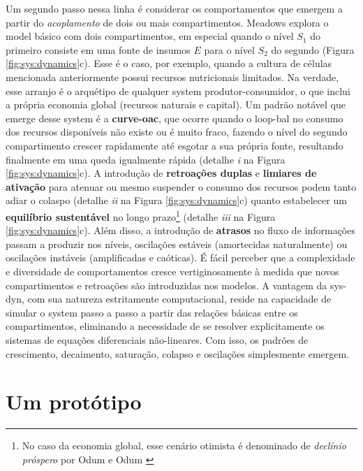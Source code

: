 \documentclass[./main.tex]{subfiles}
\begin{document}
\par Um segundo passo nessa linha é considerar os comportamentos que emergem a partir do \textit{acoplamento} de dois ou mais compartimentos. Meadows explora o \gls{model} básico com dois compartimentos, em especial quando o nível $S_1$ do primeiro consiste em uma fonte de insumos $E$ para o nível $S_2$ do segundo (Figura \ref{fig:sys:dynamics}c). Esse é o caso, por exemplo, quando a cultura de células mencionada anteriormente possui recursos nutricionais limitados. Na verdade, esse arranjo é o arquétipo de qualquer \gls{system} produtor-consumidor, o que inclui a própria economia global (recursos naturais e capital). Um padrão notável que emerge desse \gls{system} é a \textbf{\gls{curve-oac}}, que ocorre quando o \gls{loop-bal} no consumo dos recursos disponíveis não existe ou é muito fraco, fazendo o nível do segundo compartimento crescer rapidamente até esgotar a sua própria fonte, resultando finalmente em uma queda igualmente rápida (detalhe \textrm{\textit{i}} na Figura \ref{fig:sys:dynamics}c). A introdução de \textbf{retroações duplas} e \textbf{limiares de ativação} para atenuar ou mesmo suspender o consumo dos recursos podem tanto adiar o colaspo (detalhe \textrm{\textit{ii}} na Figura \ref{fig:sys:dynamics}c) quanto estabelecer um \textbf{equilíbrio sustentável} no longo prazo\footnote{No caso da economia global, esse cenário otimista é denominado de \textit{declínio próspero} por Odum e Odum \cite{odum2008}} (detalhe \textrm{\textit{iii}} na Figura \ref{fig:sys:dynamics}c). Além disso, a introdução de \textbf{atrasos} no fluxo de informações passam a produzir nos níveis, oscilações estáveis (amortecidas naturalmente) ou oscilações instáveis (amplificadas e caóticas). É fácil perceber que a complexidade e diversidade de comportamentos cresce vertiginosamente à medida que novos compartimentos e retroações são introduzidas nos modelos. A vantagem da \gls{sys-dyn}, com sua natureza estritamente computacional, reside na capacidade de simular o \gls{system} passo a passo a partir das relações básicas entre os compartimentos, eliminando a necessidade de se resolver explicitamente os sistemas de equações diferenciais não-lineares. Com isso, os padrões de crescimento, decaimento, saturação, colapso e oscilações simplesmente emergem.

\section{Um protótipo} \label{sec:systems:model}
\end{document}
